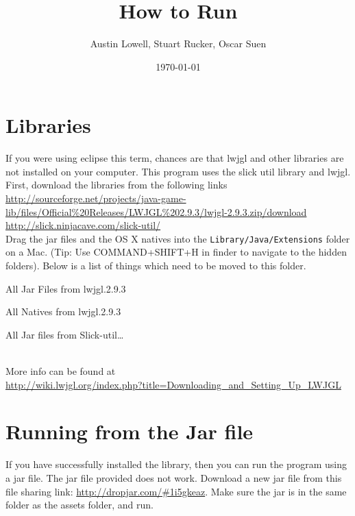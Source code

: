 \documentclass[12pt]{article}
\title{How to Run}
\author{Austin Lowell, Stuart Rucker, Oscar Suen}
\date{\today}
\begin{document}
\maketitle
\section{Libraries}
If you were using eclipse this term, chances are that lwjgl and other libraries are not installed on your computer. This program uses the slick util library and lwjgl. First, download the libraries from the following links\\
\url{http://sourceforge.net/projects/java-game-lib/files/Official%20Releases/LWJGL%202.9.3/lwjgl-2.9.3.zip/download}
\\
\url{http://slick.ninjacave.com/slick-util/}\\

Drag the jar files and the OS X natives into the \texttt{Library/Java/Extensions} folder on a Mac. (Tip: Use COMMAND+SHIFT+H in finder to navigate to the hidden folders). Below is a list of things which need to be moved to this folder.
\begin{list_type}

  \item All Jar Files from lwjgl.2.9.3
  \item All Natives from lwjgl.2.9.3
  \item All Jar files from Slick-util\ldots

\end{list_type}


\\More info can be found at\\
\url{http://wiki.lwjgl.org/index.php?title=Downloading_and_Setting_Up_LWJGL}

\section{Running from the Jar file}
If you have successfully installed the library, then you can run the program using a jar file. The jar file provided does not work. Download a new jar file from this file sharing link: \url{http://dropjar.com/#1i5gkeaz}. Make sure the jar is in the same folder as the assets folder, and run.
\end{document}
